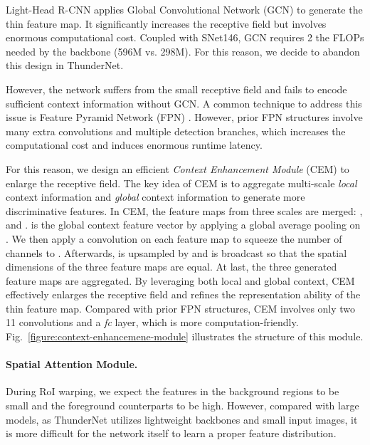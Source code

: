 \documentclass[10pt,twocolumn,letterpaper]{article}
\begin{document}
Light-Head R-CNN applies Global Convolutional Network (GCN) \cite{peng2017large} to generate the thin feature map.
It significantly increases the receptive field but involves enormous computational cost.
Coupled with SNet146, GCN requires 2 the FLOPs needed by the backbone (596M vs. 298M).
For this reason, we decide to abandon this design in ThunderNet.


However, the network suffers from the small receptive field and fails to encode sufficient context information without GCN.
A common technique to address this issue is Feature Pyramid Network (FPN) \cite{lin2017feature}.
However, prior FPN structures \cite{lin2017feature,fu2017dssd,li2018tiny,redmon2018yolov3} involve many extra convolutions and multiple detection branches, which increases the computational cost and induces enormous runtime latency.


For this reason, we design an efficient \emph{Context Enhancement Module} (CEM) to enlarge the receptive field.
The key idea of CEM is to aggregate multi-scale \emph{local} context information and \emph{global} context information to generate more discriminative features.
In CEM, the feature maps from three scales are merged: ,  and .
 is the global context feature vector by applying a global average pooling on .
We then apply a  convolution on each feature map to squeeze the number of channels to .
Afterwards,  is upsampled by  and  is broadcast so that the spatial dimensions of the three feature maps are equal.
At last, the three generated feature maps are aggregated.
By leveraging both local and global context, CEM effectively enlarges the receptive field and refines the representation ability of the thin feature map.
Compared with prior FPN structures, CEM involves only two 11 convolutions and a \emph{fc} layer, which is more computation-friendly.
Fig.~\ref{figure:context-enhancemene-module} illustrates the structure of this module.



\vspace{-12pt}
\paragraph{Spatial Attention Module.}




During RoI warping, we expect the features in the background regions to be small and the foreground counterparts to be high.
However, compared with large models, as ThunderNet utilizes lightweight backbones and small input images, it is more difficult for the network itself to learn a proper feature distribution.
\end{document}
